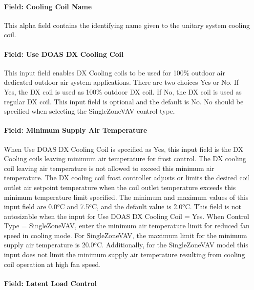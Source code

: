\paragraph{Field: Cooling Coil Name}\label{field-cooling-coil-name-002}

This alpha field contains the identifying name given to the unitary system cooling coil.

\paragraph{Field: Use DOAS DX Cooling Coil}\label{field-use-doas-dx-cooling-coil}

This input field enables DX Cooling coils to be used for 100\% outdoor air dedicated outdoor air system applications. There are two choices Yes or No. If Yes, the DX coil is used as 100\% outdoor DX coil. If No, the DX coil is used as regular DX coil. This input field is optional and the default is No. No should be specified when selecting the SingleZoneVAV control type.

\paragraph{Field: Minimum Supply Air Temperature}

When Use DOAS DX Cooling Coil is specified as Yes, this input field is the DX Cooling coils leaving minimum air temperature for frost control. The DX cooling coil leaving air temperature is not allowed to exceed this minimum air temperature. The DX cooling coil frost controller adjusts or limits the desired coil outlet air setpoint temperature when the coil outlet temperature exceeds this minimum temperature limit specified. The minimum and maximum values of this input field are 0.0\(^{o}\)C and 7.5\(^{o}\)C, and the default value is 2.0\(^{o}\)C. This field is not autosizable when the input for Use DOAS DX Cooling Coil = Yes. When Control Type = SingleZoneVAV, enter the minimum air temperature limit for reduced fan speed in cooling mode. For SingleZoneVAV, the maximum limit for the minimum supply air temperature is 20.0\(^{o}\)C. Additionally, for the SingleZoneVAV model this input does not limit the minimum supply air temperature resulting from cooling coil operation at high fan speed.


\paragraph{Field: Latent Load Control}\label{field-latent-load-control}

